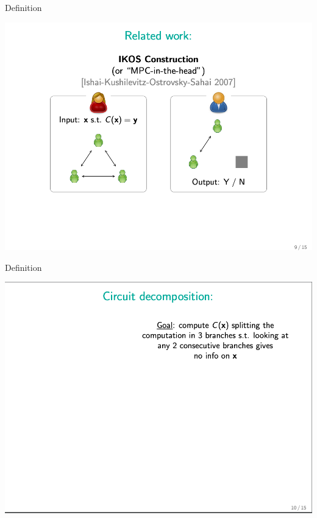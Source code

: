 \documentclass{beamer}
\begin{document}
\begin{frame}{Definition}
	\begin{minipage}{0.42\linewidth}
		\includegraphics[scale=0.4]{f10.png}
	\end{minipage}
\end{frame}


\begin{frame}{Definition}
	\begin{minipage}{0.42\linewidth}
		\includegraphics[scale=0.4]{f11.png}
	\end{minipage}
\end{frame}
\end{document}
